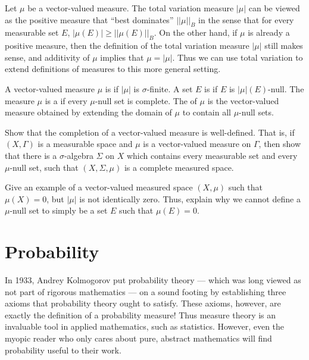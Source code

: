\begin{subsec}
Let $\mu$ be a vector-valued measure.
The total variation measure $|\mu|$ can be viewed as the positive measure that ``best dominates'' $||\mu||_{B}$ in the sense that for every measurable set $E$, $|\mu(E)| \geq ||\mu(E)||_{B}$.
On the other hand, if $\mu$ is already a positive measure, then the definition of the total variation measure $|\mu|$ still makes sense, and additivity of $\mu$ implies that $\mu = |\mu|$.
Thus we can use total variation to extend definitions of measures to this more general setting.
\end{subsec}

\begin{definition}
A vector-valued measure $\mu$ is  if $|\mu|$ is $\sigma$-finite.
A set $E$ is  if $E$ is $|\mu|(E)$-null.
The measure $\mu$ is a  if every $\mu$-null set is complete.
The  of $\mu$ is the vector-valued measure obtained by extending the domain of $\mu$ to contain all $\mu$-null sets.
\end{definition}

\begin{exercise}
Show that the completion of a vector-valued measure is well-defined.
That is, if $(X, \Gamma)$ is a measurable space and $\mu$ is a vector-valued measure on $\Gamma$, then show that there is a $\sigma$-algebra $\Sigma$ on $X$ which contains every measurable set and every $\mu$-null set, such that $(X, \Sigma, \mu)$ is a complete measured space.
\end{exercise}

\begin{exercise}
Give an example of a vector-valued measured space $(X, \mu)$ such that $\mu(X) = 0$, but $|\mu|$ is not identically zero.
Thus, explain why we cannot define a $\mu$-null set to simply be a set $E$ such that $\mu(E) = 0$.
\end{exercise}


\section{Probability}
In 1933, Andrey Kolmogorov put probability theory --- which was long viewed as not part of rigorous mathematics --- on a sound footing by establishing three axioms that probability theory ought to satisfy.
These axioms, however, are exactly the definition of a probability measure!
Thus measure theory is an invaluable tool in applied mathematics, such as statistics.
However, even the myopic reader who only cares about pure, abstract mathematics will find probability useful to their work.

